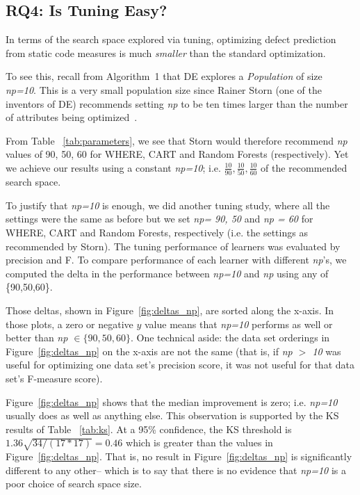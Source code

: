 \documentclass{sig-alternative}
\newcommand{\fig}[1]{Figure~\ref{fig:#1}}
\newcommand{\tab}[1]{Table ~\ref{tab:#1}}
\begin{document}
\subsection{RQ4: Is Tuning Easy?}\label{sect:easy}

In terms of the search space
explored via tuning, optimizing defect prediction from static code
measures is much {\em smaller} than the standard optimization.

To see this,
recall from Algorithm~1 that
DE explores a {\em Population} of size {\em np=10}. This is a very small population size since
Rainer Storn (one of the inventors of DE) recommends  setting {\em np} to be ten times larger than the number
of attributes being optimized~\cite{storn1997differential}.

From \tab{parameters},
we see that Storn would therefore recommend {\em np} values of
90, 50, 60 for WHERE, CART and Random Forests (respectively). Yet we achieve our results
using a constant {\em np=10}; i.e. $\frac{10}{90}, \frac{10}{50}, \frac{10}{60}$ of the
recommended search space.

To justify that {\em np=10} is enough, we did another tuning study, 
where all the settings were the same as before but we set {\em np= 90, 50} and {\em np = 60} for WHERE, CART and Random Forests, respectively (i.e. the settings
as recommended by Storn). The tuning performance of learners was evaluated
by precision and F. To compare performance of each learner with different {\em np}'s, we computed the delta in the performance between {\em np=10} and {\em np} using any of \{90,50,60\}.

Those deltas, shown in \fig{deltas_np}, are sorted along the x-axis. In those plots, a zero or negative $y$ value means that {\em np=10} performs as well or better than  {\em np $\in \{90,50,60\}$}. One technical aside: the data set orderings in \fig{deltas_np} on the x-axis are not the same (that is,
if {\em np $>$ 10} was useful for optimizing one data set's precision score, it was not useful for that data set's F-measure score).

  \fig{deltas_np} shows that
the median improvement is zero; i.e. {\em np=10} usually does as well as anything else. This observation is
supported by the   KS
  results of \tab{ks}. At a 95\% confidence, the
KS threshold  is $1.36\sqrt{34/(17*17)} = 0.46$ which is greater than  the values in \fig{deltas_np}. That is, no result in  \fig{deltas_np} is significantly different to any other-- which is to say that
there is no evidence that   {\em np=10} is a poor choice of search space size.
\end{document}

